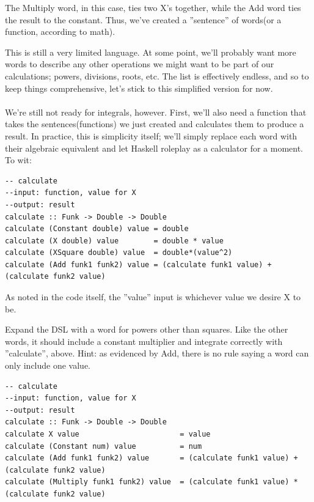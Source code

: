 The Multiply word, in this case, ties two X's together, while the Add word ties the result to the constant. Thus, we've created a ''sentence'' of words(or a function, according to math).

This is still a very limited language. At some point, we'll probably want more words to describe any other operations we might want to be part of our calculations; powers, divisions, roots, etc. The list is effectively endless, and so to keep things comprehensive, let's stick to this simplified version for now.
\fi

\paragraph{} We're still not ready for integrals, however. First, we'll also need a function that takes the sentences(functions) we just created and calculates them to produce a result. In practice, this is simplicity itself; we'll simply replace each word with their algebraic equivalent and let Haskell roleplay as a calculator for a moment. To wit:
\begin{verbatim}
-- calculate
--input: function, value for X
--output: result
calculate :: Funk -> Double -> Double
calculate (Constant double) value = double
calculate (X double) value        = double * value
calculate (XSquare double) value  = double*(value^2)
calculate (Add funk1 funk2) value = (calculate funk1 value) + (calculate funk2 value)
\end{verbatim}

As noted in the code itself, the ''value'' input is whichever value we desire X to be.

\begin{exercise}
Expand the DSL with a word for powers other than squares. Like the other words, it should include a constant multiplier and integrate correctly with ''calculate'', above. Hint: as evidenced by Add, there is no rule saying a word can only include one value.
\end{exercise}

\iffalse
\begin{verbatim}
-- calculate
--input: function, value for X
--output: result
calculate :: Funk -> Double -> Double
calculate X value                       = value
calculate (Constant num) value          = num
calculate (Add funk1 funk2) value       = (calculate funk1 value) + (calculate funk2 value)
calculate (Multiply funk1 funk2) value  = (calculate funk1 value) * (calculate funk2 value)
\end{verbatim}

